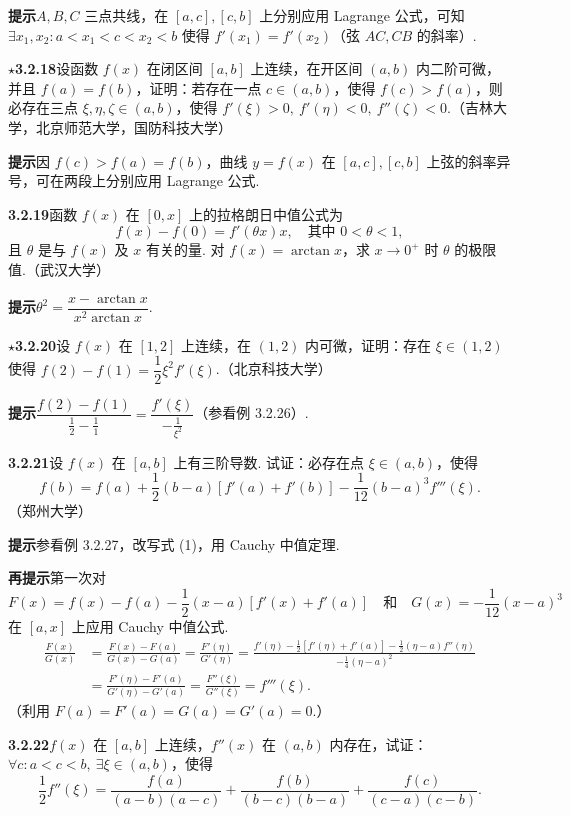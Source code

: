 \documentclass[UTF8,12pt,a4paper,fontset=fandol]{ctexart}
\begin{document}
\noindent\textbf{提示}\quad $A,B,C$ 三点共线，在 $[a,c],[c,b]$ 上分别应用 Lagrange 公式，可知 $\exists x_1,x_2:a<x_1<c<x_2<b$ 使得 $f'(x_1)=f'(x_2)$（弦 $AC,CB$ 的斜率）.

\noindent\textbf{$\star$3.2.18}\quad 设函数 $f(x)$ 在闭区间 $[a,b]$ 上连续，在开区间 $(a,b)$ 内二阶可微，并且 $f(a)=f(b)$，证明：若存在一点 $c\in(a,b)$，使得 $f(c)>f(a)$，则必存在三点 $\xi,\eta,\zeta\in(a,b)$，使得 $f'(\xi)>0,\ f'(\eta)<0,\ f''(\zeta)<0$.（吉林大学，北京师范大学，国防科技大学）

\noindent\textbf{提示}\quad 因 $f(c)>f(a)=f(b)$，曲线 $y=f(x)$ 在 $[a,c],[c,b]$ 上弦的斜率异号，可在两段上分别应用 Lagrange 公式.

\noindent\textbf{3.2.19}\quad 函数 $f(x)$ 在 $[0,x]$ 上的拉格朗日中值公式为
\[
  f(x)-f(0)=f'(\theta x)x,\quad \text{其中 }0<\theta<1,
\]
且 $\theta$ 是与 $f(x)$ 及 $x$ 有关的量. 对 $f(x)=\arctan x$，求 $x\to0^+$ 时 $\theta$ 的极限值.（武汉大学）

\noindent\textbf{提示}\quad $\theta^2=\dfrac{x-\arctan x}{x^2\arctan x}$.

\noindent\textbf{$\star$3.2.20}\quad 设 $f(x)$ 在 $[1,2]$ 上连续，在 $(1,2)$ 内可微，证明：存在 $\xi\in(1,2)$ 使得 $f(2)-f(1)=\dfrac12\xi^2 f'(\xi)$.（北京科技大学）

\noindent\textbf{提示}\quad $\dfrac{f(2)-f(1)}{\frac12-\frac11}=\dfrac{f'(\xi)}{-\frac1{\xi^2}}$（参看例 3.2.26）.

\noindent\textbf{3.2.21}\quad 设 $f(x)$ 在 $[a,b]$ 上有三阶导数. 试证：必存在点 $\xi\in(a,b)$，使得
\[
  f(b)=f(a)+\frac12(b-a)[f'(a)+f'(b)]-\frac1{12}(b-a)^3 f'''(\xi).
\tag{1}
\]
（郑州大学）

\noindent\textbf{提示}\quad 参看例 3.2.27，改写式 (1)，用 Cauchy 中值定理.

\noindent\textbf{再提示}\quad 第一次对
\[
  F(x)=f(x)-f(a)-\frac12(x-a)[f'(x)+f'(a)]
  \quad\text{和}\quad
  G(x)=-\frac1{12}(x-a)^3
\]
在 $[a,x]$ 上应用 Cauchy 中值公式.
\[
\begin{aligned}
\frac{F(x)}{G(x)}
&=\frac{F(x)-F(a)}{G(x)-G(a)}
=\frac{F'(\eta)}{G'(\eta)}
=\frac{f'(\eta)-\frac12[f'(\eta)+f'(a)]-\frac12(\eta-a)f''(\eta)}
{-\frac14(\eta-a)^2}\\
&=\frac{F'(\eta)-F'(a)}{G'(\eta)-G'(a)}
=\frac{F''(\xi)}{G''(\xi)}
=f'''(\xi).
\end{aligned}
\]
（利用 $F(a)=F'(a)=G(a)=G'(a)=0$.）

\noindent\textbf{3.2.22}\quad $f(x)$ 在 $[a,b]$ 上连续，$f''(x)$ 在 $(a,b)$ 内存在，试证：$\forall c:a<c<b,\ \exists \xi\in(a,b)$，使得
\[
  \frac12f''(\xi)=
  \frac{f(a)}{(a-b)(a-c)}
  +\frac{f(b)}{(b-c)(b-a)}
  +\frac{f(c)}{(c-a)(c-b)}.
\tag{1}
\]
\end{document}
